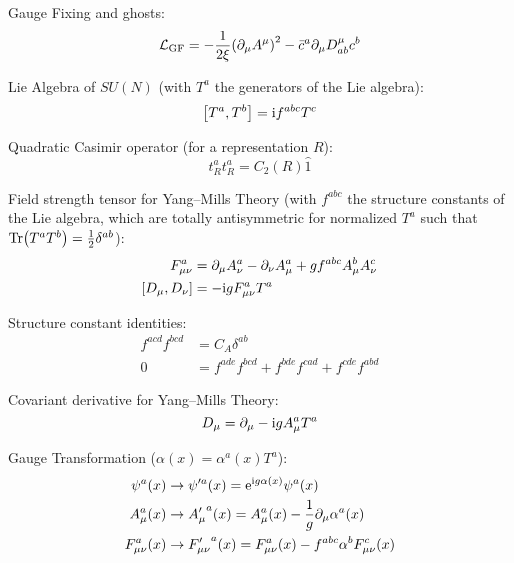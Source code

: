 		\noindent
		Gauge Fixing and ghosts:
		\begin{equation}
			\mathcal{L}_\text{GF} = -\frac{1}{2\xi} \qty(\partial_\mu A^\mu)^2 - \bar{c}^a \partial_\mu D^\mu_{ab} c^b
		\end{equation}

		\noindent
		Lie Algebra of $SU(N)$ (with $T^a$ the generators of the Lie algebra):
		\begin{equation}
			\comm{T^a}{T^b} = \i f^{abc} T^c
		\end{equation}

		\noindent
		Quadratic Casimir operator (for a representation $R$):
		\begin{equation}
			t^a_R t^a_R = C_2(R) \hat{1}
		\end{equation}

		\noindent
		Field strength tensor for Yang--Mills Theory (with $f^{abc}$ the structure constants of the Lie algebra, which are totally antisymmetric for normalized $T^a$ such that $\Tr(T^a T^b) = \frac{1}{2} \delta^{ab}$):
		\begin{equation}
			\begin{aligned}
				F^a_{\mu\nu} &= \partial_\mu A^a_\nu - \partial_\nu A^a_\mu + g f^{abc} A^b_\mu A^c_\nu \\
				\comm{D_\mu}{D_\nu} &= -\i g F_{\mu\nu}^a T^a
			\end{aligned}
		\end{equation}

		\noindent
		Structure constant identities:
		\begin{align}
			f^{acd} f^{bcd} &= C_A \delta^{ab} \\
			0 &= f^{ade} f^{bcd} + f^{bde} f^{cad} + f^{cde} f^{abd}
		\end{align}

		\noindent
		Covariant derivative for Yang--Mills Theory:
		\begin{equation}
			D_\mu = \partial_\mu - \mathrm{i} g A_\mu^a T^a
		\end{equation}

		\noindent
		Gauge Transformation ($\alpha(x) = \alpha^a(x) T^a$):
		\begin{equation}
			\begin{aligned}
				\psi^a(x) & \to \psi'^a(x) = \mathrm{e}^{\mathrm{i} g \alpha(x)} \psi^a(x) \\
				A_\mu^a(x) & \to {A'_\mu}^a(x) = A_\mu^a(x) - \frac{1}{g} \partial_\mu \alpha^a(x) \\
				F_{\mu\nu}^a(x) & \to {F'_{\mu\nu}}^a(x) = F_{\mu\nu}^a(x) - f^{abc} \alpha^b F_{\mu\nu}^c(x)
			\end{aligned}
		\end{equation}

